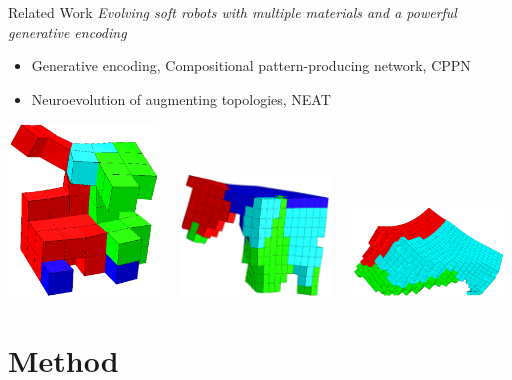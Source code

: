 \documentclass[6pt]{beamer}
\begin{document}
\begin{frame}{Related Work}
\textit{Evolving soft robots with multiple materials and a powerful generative encoding}~
\begin{itemize}
\item Generative encoding, Compositional pattern-producing network, CPPN
\item Neuroevolution of augmenting topologies, NEAT
\end{itemize}
\vspace{0.3cm}
\includegraphics[width=0.3\textwidth,height=0.25\textheight]{../Figures/Misc/unshacklingEvolutionFigure1.png}\	\	\	
\includegraphics[width=0.3\textwidth,height=0.25\textheight]{../Figures/Misc/unshacklingEvolutionFigure2.png}\	\	\	
\includegraphics[width=0.3\textwidth,height=0.25\textheight]{../Figures/Misc/unshacklingEvolutionFigure3.png}
\end{frame}









\section{Method}
\end{document}
